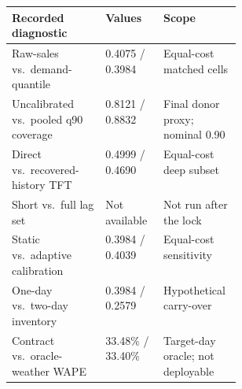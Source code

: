 \begin{tabularx}{\linewidth}{@{}>{\raggedright\arraybackslash}Xl>{\raggedright\arraybackslash}p{0.34\linewidth}@{}}
\toprule
Recorded diagnostic & Values & Scope \\
\midrule
Raw-sales vs.\ demand-quantile & 0.4075 / 0.3984 & Equal-cost matched cells \\
Uncalibrated vs.\ pooled q90 coverage & 0.8121 / 0.8832 & Final donor proxy; nominal 0.90 \\
Direct vs.\ recovered-history TFT & 0.4999 / 0.4690 & Equal-cost deep subset \\
Short vs.\ full lag set & Not available & Not run after the lock \\
Static vs.\ adaptive calibration & 0.3984 / 0.4039 & Equal-cost sensitivity \\
One-day vs.\ two-day inventory & 0.3984 / 0.2579 & Hypothetical carry-over \\
Contract vs.\ oracle-weather WAPE & 33.48\% / 33.40\% & Target-day oracle; not deployable \\
\bottomrule
\end{tabularx}
